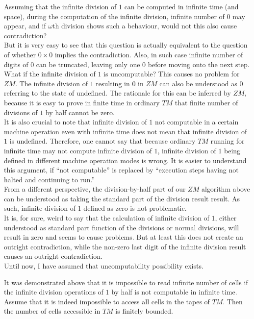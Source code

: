 \documentclass{roffin}
\begin{document}
Assuming that the infinite division of $1$ can be computed in infinite time (and space), during the computation of the infinite division, infinite number of $0$ may appear, and if $\omega$th division shows such a behaviour, would not this also cause contradiction?\\
But it is very easy to see that this question is actually equivalent to the question of whether $0 \times 0$ implies the contradiction. Also, in such case infinite number of digits of $0$ can be truncated, leaving only one $0$ before moving onto the next step.\\
What if the infinite division of $1$ is uncomputable? This causes no problem for $ZM$. The infinite division of $1$ resulting in $0$ in $ZM$ can also be understood as $0$ referring to the state of undefined. The rationale for this can be inferred by $ZM$, because it is easy to prove in finite time in ordinary $TM$ that finite number of divisions of $1$ by half cannot be zero.\\
It is also crucial to note that infinite division of $1$ not computable in a certain machine operation even with infinite time does not mean that infinite division of $1$ is undefined. Therefore, one cannot say that because ordinary $TM$ running for infinite time may not compute infinite division of $1$, infinite division of $1$ being defined in different machine operation modes is wrong. It is easier to understand this argument, if ``not computable'' is replaced by ``execution steps having not halted and continuing to run.''\\
From a different perspective, the division-by-half part of our $ZM$ algorithm above can be understood as taking the standard part of the division result result. As such, infinite division of $1$ defined as zero is not problematic.\\
It is, for sure, weird to say that the calculation of infinite division of $1$, either understood as standard part function of the divisions or normal divisions, will result in zero and seems to cause problems. But at least this does not create an outright contradiction, while the non-zero last digit of the infinite division result causes an outright contradiction.\\
Until now, I have assumed that uncomputability possibility exists.
\begin{proposition}
It was demonstrated above that it is impossible to read infinite number of cells if the infinite division operations of $1$ by half is not computable in infinite time. Assume that it is indeed impossible to access all cells in the tapes of $TM$. Then the number of cells accessible in $TM$ is finitely bounded.   
\end{proposition}
\end{document}
